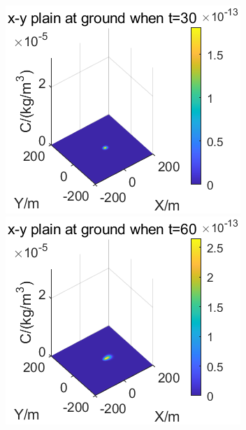 \documentclass{article}
\begin{document}
	\begin{figure}[htbp]
		\begin{minipage}{0.33\textwidth}
			\includegraphics[width=\textwidth]{pics/g=-1,t=30.png}
		\end{minipage}
		\begin{minipage}{0.33\textwidth}
			\includegraphics[width=\textwidth]{pics/g=-1,t=60.png}
		\end{minipage}

\end{figure}
\end{document}
